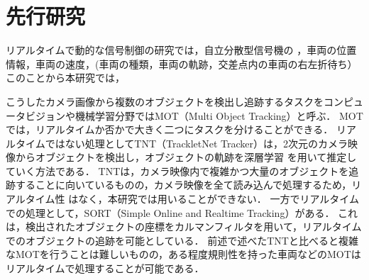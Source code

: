 \section{先行研究}
リアルタイムで動的な信号制御の研究\cite{hayashi}\cite{konaka}\cite{shirai}では，自立分散型信号機の
，車両の位置情報，車両の速度，(車両の種類，車両の軌跡，交差点内の車両の右左折待ち）
このことから本研究では，

こうしたカメラ画像から複数のオブジェクトを検出し追跡するタスクをコンピュータビジョンや機械学習分野ではMOT（Multi Object Tracking）と呼ぶ．
MOTでは，リアルタイムか否かで大きく二つにタスクを分けることができる．
リアルタイムではない処理としてTNT（TrackletNet Tracker）は，2次元のカメラ映像からオブジェクトを検出し，オブジェクトの軌跡を深層学習
を用いて推定していく方法である．\cite{wang2019exploit} \cite{tang2018single} TNTは，カメラ映像内で複雑かつ大量のオブジェクトを追跡することに向いているものの，カメラ映像を全て読み込んで処理するため，リアルタイム性
はなく，本研究では用いることができない．
一方でリアルタイムでの処理として，SORT（Simple Online and Realtime Tracking）がある．\cite{bewley2016simple} \cite{wojke2017simple}
これは，検出されたオブジェクトの座標をカルマンフィルタ\cite{kalman1960new}を用いて，リアルタイムでのオブジェクトの追跡を可能としている．
前述で述べたTNTと比べると複雑なMOTを行うことは難しいものの，ある程度規則性を持った車両などのMOTはリアルタイムで処理することが可能である．

\newpage

